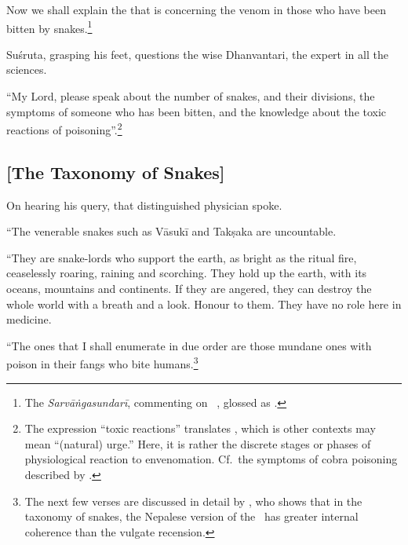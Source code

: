 \begin{translation}
    
    \item[1] Now we shall explain the  that is
 concerning the venom in those
who have been bitten by
snakes.\footnote{\label{arunadatta:kalpa}The
    \emph{Sarvāṅgasundarī}, commenting on \AH\ ,
    glossed  as .}
    
    \item[3] Suśruta, grasping his feet, questions the wise Dhanvantari, the 
    expert in all the sciences.



    \item[4]
    
    “My Lord, please speak about the number of snakes, and their
divisions, the symptoms of someone who has been bitten, and the
knowledge about the toxic reactions of
poisoning”.\footnote{The expression “toxic reactions” translates
    , which is other contexts may mean “(natural) urge.”  Here,
    it is rather the discrete stages or phases of physiological reaction
    to envenomation.  Cf.\ the symptoms of cobra poisoning described by
    \citet[80]{wall-1913}.}
        
        
\subsection{[The Taxonomy of Snakes]}
        
    \item[5]
    
    On hearing his query, that distinguished physician spoke.
    
    “The venerable snakes such as Vāsukī and Takṣaka are uncountable. 
    
\item[6--9ab]

“They are snake-lords who support the earth, as bright as the ritual fire,
ceaselessly roaring, raining and scorching. They hold up the earth, with its
oceans, mountains and continents. If they are angered, they can destroy the
whole world with a breath and a look.  Honour to them. They have no role
here in medicine.

“The ones that I shall enumerate in due order are those mundane
ones with poison in their fangs who bite humans.\footnote{The next few
    verses are discussed in detail by \citet[101--104]{hari-2011}, who shows
    that in the taxonomy of snakes, the Nepalese version of the \SS\ has greater
    internal coherence than the vulgate recension.}


\end{translation}

